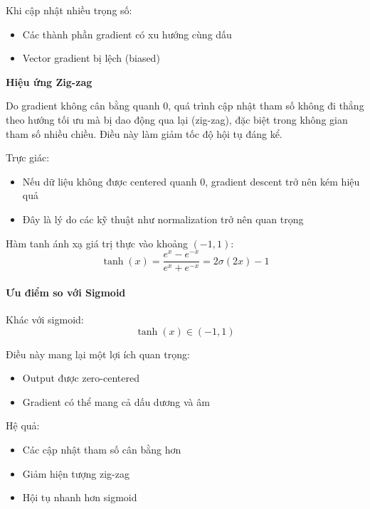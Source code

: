 \begin{description}
	Khi cập nhật nhiều trọng số:
	\begin{itemize}
		\item Các thành phần gradient có xu hướng cùng dấu
		\item Vector gradient bị lệch (biased)
	\end{itemize}
	
	\begin{mdframed}[style=infobox]
		\textbf{Hiệu ứng Zig-zag}
		
		Do gradient không cân bằng quanh 0, quá trình cập nhật tham số không đi thẳng theo hướng tối ưu mà bị dao động qua lại (zig-zag), đặc biệt trong không gian tham số nhiều chiều. Điều này làm giảm tốc độ hội tụ đáng kể.
	\end{mdframed}
	
	Trực giác:
	\begin{itemize}
		\item Nếu dữ liệu không được centered quanh 0, gradient descent trở nên kém hiệu quả
		\item Đây là lý do các kỹ thuật như normalization trở nên quan trọng
	\end{itemize}
	
	\item[Tanh (Hyperbolic Tangent):] Hàm tanh ánh xạ giá trị thực vào khoảng $(-1, 1)$:
	\begin{equation}
		\tanh(x) = \frac{e^x - e^{-x}}{e^x + e^{-x}} = 2\sigma(2x) - 1
	\end{equation}
	
	\paragraph{Ưu điểm so với Sigmoid}
	
	Khác với sigmoid:
	\[
	\tanh(x) \in (-1, 1)
	\]
	
	Điều này mang lại một lợi ích quan trọng:
	
	\begin{itemize}
		\item Output được zero-centered
		\item Gradient có thể mang cả dấu dương và âm
	\end{itemize}
	
	Hệ quả:
	\begin{itemize}
		\item Các cập nhật tham số cân bằng hơn
		\item Giảm hiện tượng zig-zag
		\item Hội tụ nhanh hơn sigmoid
	\end{itemize}
	

\end{description}
